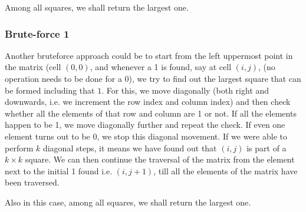 Among all squares, we shall return the largest one. 




\subsubsection{Brute-force 1}

Another bruteforce approach could be to start from the left uppermost point in the matrix (cell $(0,0)$, and whenever a 1 is found, say at cell $(i,j)$, (no operation needs to be done for a 0), we try to find out the largest square that can be formed including that $1$. For this, we move diagonally (both right and downwards, i.e. we increment the row index and column index) and then check whether all the elements of that row and column are 1 or not. If all the elements happen to be 1, we move diagonally further and repeat the check. If even one element turns out to be 0, we stop this diagonal movement. If we were able to perform $k$ diagonal steps, it means we have found out that $(i,j)$ is part of a $k\times k$ square. 
We can then continue the traversal of the matrix from the element next to the initial 1 found i.e. $(i,j+1)$, till all the elements of the matrix have been traversed.

Also in this case, among all squares, we shall return the largest one. 




